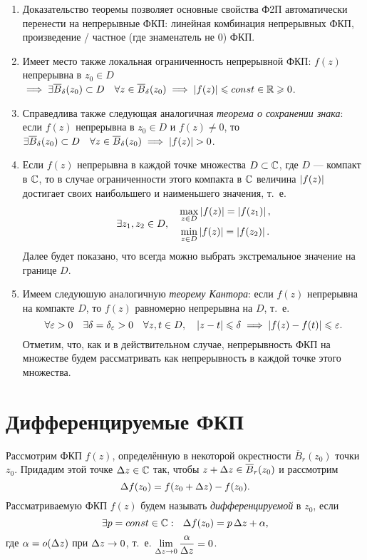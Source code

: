 \documentclass[../../main.tex]{subfiles}
\begin{document}
\begin{rems}
	\;
	
	\begin{enumerate}
		\item Доказательство теоремы позволяет основные свойства Ф2П автоматически
		перенести на непрерывные ФКП: линейная комбинация непрерывных ФКП,
		произведение / частное (где знаменатель не 0) ФКП.
		\item Имеет место также локальная ограниченность непрерывной ФКП:
		$f(z)$ непрерывна в $z_0 \in D$
		$\implies \exists \overline{B}_{\delta} (z_0) \subset D \quad
		\forall z \in \overline{B}_{\delta} (z_0) \implies
		\left|{f(z)}\right| \leqslant const \in \mathbb{R} \geqslant 0$.
		\item Справедлива также следующая аналогичная
		\emph{теорема о сохранении знака}:
		если $f(z)$ непрерывна в $z_0 \in D$ и $f(z) \ne 0$, то
		$\exists \overline{B}_{\delta} (z_0) \subset D
		\quad \forall z \in \overline{B}_{\delta} (z_0) \implies \left|{f(z)}\right| > 0$.
		\item Если $f(z)$ непрерывна в каждой точке множества $D \subset \mathbb{C}$,
		где $D$ --- компакт в $\mathbb{C}$, то в случае ограниченности этого компакта в $\mathbb{C}$
		величина $\left|{f(z)}\right|$ достигает своих наибольшего и наименьшего значения,
		т.~е.
		\[
		\exists z_1, z_2 \in D, \quad
		\begin{gathered}
			\max\limits_{z \in D} \left|{f(z)}\right| = \left|{f(z_1)}\right|, \\
			\min\limits_{z \in D} \left|{f(z)}\right| = \left|{f(z_2)}\right|.
		\end{gathered}
		\]
		Далее будет показано, что всегда можно выбрать экстремальное значение
		на границе $D$.
		\item Имеем следуюшую аналогичную \emph{теорему Кантора}:
		если $f(z)$ непрерывна на компакте $D$,
		то $f(z)$ равномерно непрерывна на $D$, т.~е.
		\[
		\forall \varepsilon > 0 \quad \exists \delta = \delta_{\varepsilon} > 0 \quad
		\forall z, t \in D, \quad \left|{z - t}\right| \leqslant \delta
		\implies \left|{f(z) - f(t)}\right| \leqslant \varepsilon.
		\]
		Отметим, что, как и в действительном случае, непрерывность ФКП на множестве
		будем рассматривать как непрерывность в каждой точке этого множества.
	\end{enumerate}
\end{rems}

\section{Дифференцируемые ФКП}

Рассмотрим ФКП $f(z)$, определённую в некоторой окрестности
$\overline{B}_r (z_0)$ точки $z_0$. Придадим этой точке $\Delta z \in \mathbb{C}$ так,
чтобы $z + \Delta z \in \overline{B}_r (z_0)$ и рассмотрим
\begin{equation}
\label{lec28:3}
\Delta f(z_0) = f(z_0 + \Delta z) - f(z_0).
\end{equation}
Рассматриваемую ФКП $f(z)$ будем называть \emph{дифференцируемой} в $z_0$,
если
\begin{equation}
\label{lec28:4}
\exists p = const \in \mathbb{C} : \ \
\Delta f(z_0) = p\, \Delta z + \alpha,
\end{equation}
где $\alpha = o(\Delta z)$ при $\Delta z \to 0$,
т.~е. $\lim\limits_{\Delta z \to 0} \dfrac{\alpha}{\Delta z} = 0$.
\end{document}
